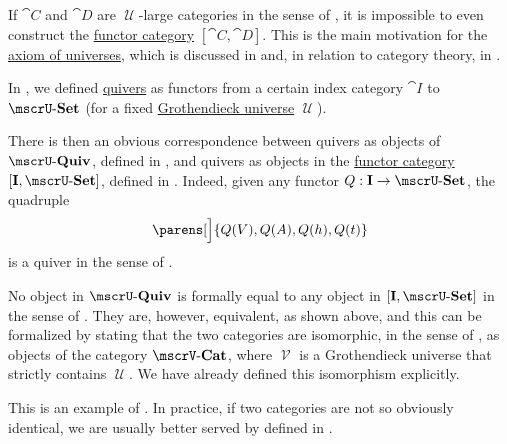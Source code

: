 \begin{remark}\label{rem:functor_category_size}
  If \( \cat{C} \) and \( \cat{D} \) are \( \mscrU \)-large categories in the sense of , it is impossible to even construct the \hyperref[def:functor_category]{functor category} \( [\cat{C}, \cat{D}] \). This is the main motivation for the \hyperref[def:axiom_of_universes]{axiom of universes}, which is discussed in  and, in relation to category theory, in .
\end{remark}

\begin{example}\label{ex:isomorphism_of_categories}
  In , we defined \hyperref[def:quiver]{quivers} as functors from a certain index category \( \cat{I} \) to \( \ucat{Set} \) (for a fixed \hyperref[def:grothendieck_universe]{Grothendieck universe} \( \mscrU \)).

  There is then an obvious correspondence between quivers as objects of \hyperref[def:category_of_small_quivers]{\( \ucat{Quiv} \)}, defined in , and quivers as objects in the \hyperref[def:functor_category]{functor category} \( [\cat{I}, \ucat{Set}] \), defined in . Indeed, given any functor \( Q: \cat{I} \to \ucat{Set} \), the quadruple
  \begin{equation*}
    \parens[\Big]{ Q(V), Q(A), Q(h), Q(t) }
  \end{equation*}
  is a quiver in the sense of .

  No object in \( \ucat{Quiv} \) is formally equal to any object in \( [\cat{I}, \ucat{Set}] \) in the sense of \hyperref[def:zfc]{}. They are, however, equivalent, as shown above, and this can be formalized by stating that the two categories are isomorphic, in the sense of , as objects of the category \( \ucat[\mscrV]{Cat} \), where \( \mscrV \) is a Grothendieck universe that strictly contains \( \mscrU \). We have already defined this isomorphism explicitly.

  This is an example of . In practice, if two categories are not so obviously identical, we are usually better served by  defined in .
\end{example}


